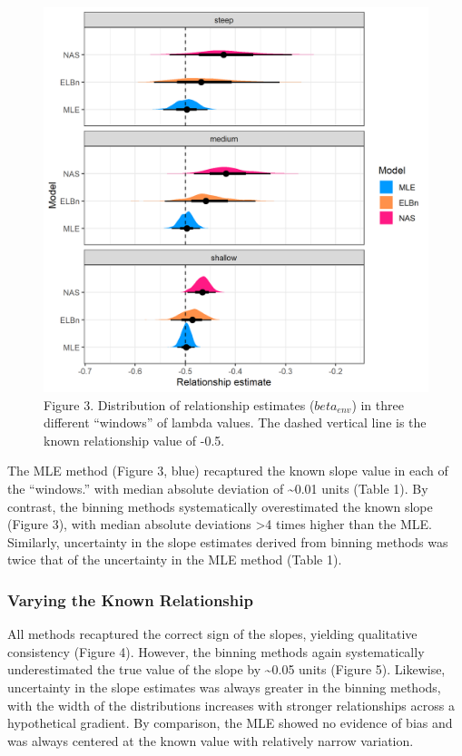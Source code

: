 \documentclass[
]{article}
\begin{document}
\begin{figure}
\centering
\includegraphics{figures/lambda_angle_plot.png}
\caption{Figure 3. Distribution of relationship estimates
(\(beta_{env}\)) in three different ``windows'' of lambda values. The
dashed vertical line is the known relationship value of -0.5.}
\end{figure}

The MLE method (Figure 3, blue) recaptured the known slope value in each
of the ``windows.'' with median absolute deviation of
\textasciitilde0.01 units (Table 1). By contrast, the binning methods
systematically overestimated the known slope (Figure 3), with median
absolute deviations \textgreater4 times higher than the MLE. Similarly,
uncertainty in the slope estimates derived from binning methods was
twice that of the uncertainty in the MLE method (Table 1).

\hypertarget{varying-the-known-relationship}{%
\subsubsection{Varying the Known
Relationship}\label{varying-the-known-relationship}}

All methods recaptured the correct sign of the slopes, yielding
qualitative consistency (Figure 4). However, the binning methods again
systematically underestimated the true value of the slope by
\textasciitilde0.05 units (Figure 5). Likewise, uncertainty in the slope
estimates was always greater in the binning methods, with the width of
the distributions increases with stronger relationships across a
hypothetical gradient. By comparison, the MLE showed no evidence of bias
and was always centered at the known value with relatively narrow
variation.
\end{document}
